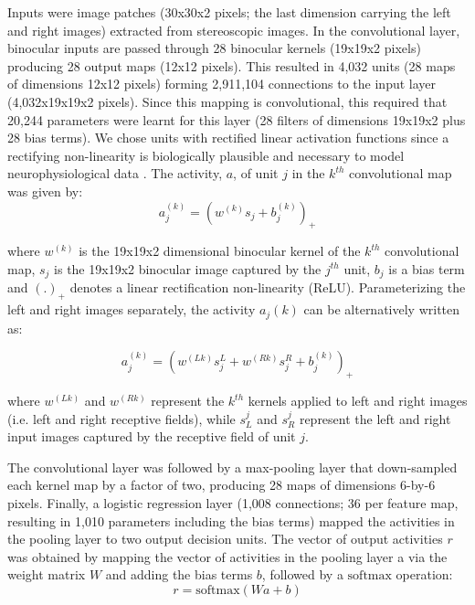 Inputs were image patches (30x30x2 pixels; the last dimension carrying the left and right images) extracted from stereoscopic images. In the convolutional layer, binocular inputs are passed through 28 binocular kernels (19x19x2 pixels) producing 28 output maps (12x12 pixels). This resulted in 4,032 units (28 maps of dimensions 12x12 pixels) forming 2,911,104 connections to the input layer (4,032x19x19x2 pixels). Since this mapping is convolutional, this required that 20,244 parameters were learnt for this layer (28 filters of dimensions 19x19x2 plus 28 bias terms). We chose units with rectified linear activation functions since a rectifying non-linearity is biologically plausible and necessary to model neurophysiological data \cite{Movshon:1978dq}. The activity, $a$, of unit $j$ in the $k^{th}$ convolutional map was given by:
\begin{equation}
  a_j^{(k)}=(w^{(k)}s_j + b_j^{(k)} )_+
\end{equation}

where $w^{(k)}$ is the 19x19x2 dimensional binocular kernel of the $k^{th}$ convolutional map, $s_j$ is the 19x19x2 binocular image captured by the $j^{th}$ unit, $b_j$ is a bias term and $(.)_+$ denotes a linear rectification non-linearity (ReLU). Parameterizing the left and right images separately, the activity $a_j{(k)}$ can be alternatively written as:

\begin{equation}
  a_j^{(k)}=(w^{(Lk)}s_j^L + w^{(Rk)}s_j^R + b_j^{(k)})_+
\end{equation}

where $w^{(Lk)}$ and $w^{(Rk)}$ represent the $k^{th}$ kernels applied to left and right images (i.e. left and right receptive fields), while $s_L^j$ and $s_R^j$ represent the left and right input images captured by the receptive field of unit $j$. 

The convolutional layer was followed by a max-pooling layer that down-sampled each kernel map by a factor of two, producing 28 maps of dimensions 6-by-6 pixels. Finally, a logistic regression layer (1,008 connections; 36 per feature map, resulting in 1,010 parameters including the bias terms) mapped the activities in the pooling layer to two output decision units. The vector of output activities $r$ was obtained by mapping the vector of activities in the pooling layer a via the weight matrix $W$ and adding the bias terms $b$, followed by a $\mathrm{softmax}$ operation:
\begin{equation}
  r=\mathrm{softmax}(Wa+b)
\end{equation}

